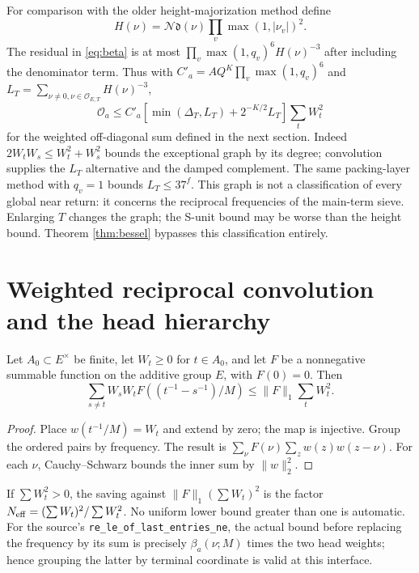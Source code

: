 \documentclass[11pt,a4paper]{article}
\newcommand{\N}{\mathcal N}\newcommand{\OO}{\mathcal O}\newcommand{\KK}{\mathscr K}\newcommand{\Tr}{\operatorname{tr}}\newcommand{\rk}{\operatorname{rank}}\newcommand{\len}{\operatorname{length}}\newcommand{\diag}{\operatorname{diag}}\newcommand{\vol}{\operatorname{vol}}\newcommand{\Id}{\mathrm I}\newcommand{\vG}{v_{\mathrm G}}\newcommand{\supp}{\operatorname{supp}}\newcommand{\status}[1]{\par\smallskip\noindent\textit{Status.} #1\par\smallskip}
\begin{document}
For comparison with the older height-majorization method define
\[H(\nu)=\N\mathfrak d(\nu)\prod_v\max(1,|\nu_v|)^2.\] The residual in \eqref{eq:beta} is at most $\prod_v\max(1,q_v)^6 H(\nu)^{-3}$ after including the denominator term. Thus with $C'_a=A Q^K\prod_v\max(1,q_v)^6$ and $L_T=\sum_{\nu\ne0,\nu\in\OO_{E,T}}H(\nu)^{-3}$,
\begin{equation}\label{eq:sunit}
\mathcal O_a\leq C'_a[\min(\Delta_T,L_T)+2^{-K/2}L_T]\sum_tW_t^2
\end{equation}
for the weighted off-diagonal sum defined in the next section. Indeed $2W_tW_s\leq W_t^2+W_s^2$ bounds the exceptional graph by its degree; convolution supplies the $L_T$ alternative and the damped complement. The same packing-layer method with $q_v=1$ bounds $L_T\leq37^f$. This graph is not a classification of every global near return: it concerns the reciprocal frequencies of the main-term sieve. Enlarging $T$ changes the graph; the S-unit bound may be worse than the height bound. Theorem \ref{thm:bessel} bypasses this classification entirely.

\section{Weighted reciprocal convolution and the head hierarchy}\label{sec:recurrence}
\begin{proposition}\label{prop:conv}
Let $A_0\subset E^\times$ be finite, let $W_t\geq0$ for $t\in A_0$, and let $F$ be a nonnegative summable function on the additive group $E$, with $F(0)=0$. Then
\begin{equation}\label{eq:conv}
\sum_{s\ne t} W_sW_t F((t^{-1}-s^{-1})/M)\leq \|F\|_1\sum_tW_t^2.
\end{equation}
\end{proposition}
\begin{proof}Place $w(t^{-1}/M)=W_t$ and extend by zero; the map is injective. Group the ordered pairs by frequency. The result is $\sum_\nu F(\nu)\sum_z w(z)w(z-\nu)$. For each $\nu$, Cauchy--Schwarz bounds the inner sum by $\|w\|_2^2$.\end{proof}
If $\sum W_t^2>0$, the saving against $\|F\|_1(\sum W_t)^2$ is the factor $N_{\rm eff}=(\sum W_t)^2/\sum W_t^2$. No uniform lower bound greater than one is automatic. For the source's \texttt{re\_\allowbreak le\_\allowbreak of\_\allowbreak last\_\allowbreak entries\_\allowbreak ne}, the actual bound before replacing the frequency by its sum is precisely $\beta_a(\nu;M)$ times the two head weights; hence grouping the latter by terminal coordinate is valid at this interface.
\end{document}
